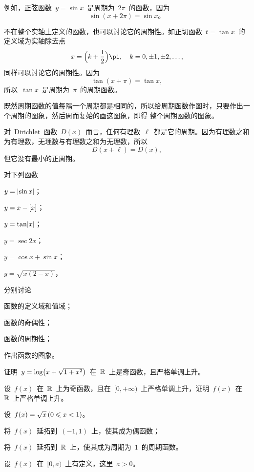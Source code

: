 例如，正弦函数~$y=\sin x$~是周期为~$2\pi$~的函数，因为
\[
  \sin(x+2\pi)=\sin x。
\]

不在整个实轴上定义的函数，也可以讨论它的周期性。如正切函数~$t=\tan x$~的定义域为实轴除去点
\[
  x=\Paren[\Big]{k+\frac12}\pi,\quad k=0,\pm1,\pm2,\dotsc,
\]
同样可以讨论它的周期性。因为
\[
  \tan(x+\pi)=\tan x,
\]
所以~$\tan x$~是周期为~$\pi$~的周期函数。

既然周期函数的值每隔一个周期都是相同的，所以给周期函数作图时，只要作出一个周期的图象，然后周而复始的画这图象，即得
整个周期函数的图象。

对~Dirichlet~函数~$D(x)$~而言，任何有理数~$\ell$~都是它的周期。因为有理数之和为有理数，无理数与有理数之和为无理数，所以
\[
  D(x+\ell)=D(x),
\]
但它没有最小的正周期。

\begin{exercise}
\item 对下列函数
\begin{exlistcols}[3]
  \item $y=\lvert\sin x\rvert$；
  \item $y=x-\lbrack x\rbrack$；
  \item $y=\tan\lvert x\rvert$；
  \item $y=\sec 2x$；
  \item $y=\cos x+\sin x$；
  \item $y=\sqrt{x(2-x)}$，
\end{exlistcols}
分别讨论
\begin{exlistcols}
  \item 函数的定义域和值域；
  \item 函数的奇偶性；
  \item 函数的周期性；
  \item 作出函数的图象。
\end{exlistcols}
\item 证明~$y=\log\bigl\lparen x+\sqrt{1+x^2}\bigr\rparen$~在~$\mathbb{R}$~上是奇函数，且严格单调上升。
\item 设~$f(x)$~在~$\mathbb{R}$~上为奇函数，且在~$[0,+\infty)$~上严格单调上升，证明~$f(x)$~在~$\mathbb{R}$~上严格单调上升。
\item 设~$f(x)=\smsqrt x\,(0\leq x<1)$。
\begin{exlist}
  \item 将~$f(x)$~延拓到~$(-1,1)$~上，使其成为偶函数；
  \item 将~$f(x)$~延拓到~$\mathbb{R}$~上，使其成为周期为~$1$~的周期函数。
\end{exlist}
\item 设~$f(x)$~在~$[0,a)$~上有定义，这里~$a>0$。
\begin{exlist}

\end{exlist}
\end{exercise}
